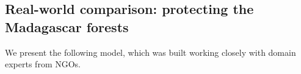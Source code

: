 %
%

\subsection{Real-world comparison: protecting the Madagascar forests}
We present the following model, which was built working closely with domain experts from NGOs.

